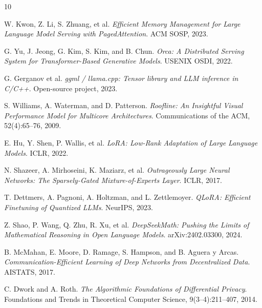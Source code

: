 \documentclass[11pt]{article}
\begin{document}
\begin{thebibliography}{10}

W. Kwon, Z. Li, S. Zhuang, et al.
\textit{Efficient Memory Management for Large Language Model Serving with PagedAttention}.
ACM SOSP, 2023.

G. Yu, J. Jeong, G. Kim, S. Kim, and B. Chun.
\textit{Orca: A Distributed Serving System for Transformer-Based Generative Models}.
USENIX OSDI, 2022.

G. Gerganov et al.
\textit{ggml / llama.cpp: Tensor library and LLM inference in C/C++}.
Open-source project, 2023.

S. Williams, A. Waterman, and D. Patterson.
\textit{Roofline: An Insightful Visual Performance Model for Multicore Architectures}.
Communications of the ACM, 52(4):65--76, 2009.

E. Hu, Y. Shen, P. Wallis, et al.
\textit{LoRA: Low-Rank Adaptation of Large Language Models}.
ICLR, 2022.

N. Shazeer, A. Mirhoseini, K. Maziarz, et al.
\textit{Outrageously Large Neural Networks: The Sparsely-Gated Mixture-of-Experts Layer}.
ICLR, 2017.

T. Dettmers, A. Pagnoni, A. Holtzman, and L. Zettlemoyer.
\textit{QLoRA: Efficient Finetuning of Quantized LLMs}.
NeurIPS, 2023.

Z. Shao, P. Wang, Q. Zhu, R. Xu, et al.
\textit{DeepSeekMath: Pushing the Limits of Mathematical Reasoning in Open Language Models}.
arXiv:2402.03300, 2024.

B. McMahan, E. Moore, D. Ramage, S. Hampson, and B. Aguera y Arcas.
\textit{Communication-Efficient Learning of Deep Networks from Decentralized Data}.
AISTATS, 2017.

C. Dwork and A. Roth.
\textit{The Algorithmic Foundations of Differential Privacy}.
Foundations and Trends in Theoretical Computer Science, 9(3--4):211--407, 2014.

\end{thebibliography}
\end{document}
